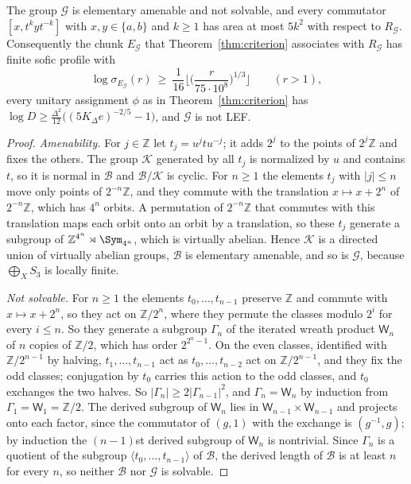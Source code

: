 \begin{theorem}\label{thm:dyadic}
The group $\mathcal G$ is elementary amenable and not solvable, and every commutator $[x,t^kyt^{-k}]$ with $x,y\in\{a,b\}$ and
$k\ge1$ has area at most $5k^2$ with respect to $R_{\mathcal G}$. Consequently the chunk $E_{\mathcal G}$ that Theorem~\ref{thm:criterion}
associates with $R_{\mathcal G}$ has finite sofic profile with
\[
\log\sigma_{E_{\mathcal G}}(r)\ \ge\ \frac1{16}\Big\lfloor\Big(\frac r{75\cdot10^8}\Big)^{1/3}\Big\rfloor\qquad(r>1),
\]
every unitary assignment $\phi$ as in Theorem~\ref{thm:criterion} has $\log D\ge\frac{\Delta^2}{12}\bigl((5K_\Delta e)^{-2/5}-1\bigr)$, and
$\mathcal G$ is not LEF.
\end{theorem}

\begin{proof}
\emph{Amenability.} For $j\in\mathbb Z$ let $t_j=u^jtu^{-j}$; it adds $2^j$ to the points of $2^j\mathbb Z$ and fixes the others. The group $\mathcal K$
generated by all $t_j$ is normalized by $u$ and contains $t$, so it is normal in $\mathcal B$ and $\mathcal B/\mathcal K$ is cyclic. For $n\ge1$ the elements $t_j$ with
$|j|\le n$ move only points of $2^{-n}\mathbb Z$, and they commute with the translation $x\mapsto x+2^n$ of $2^{-n}\mathbb Z$, which has $4^n$
orbits. A permutation of $2^{-n}\mathbb Z$ that commutes with this translation maps each orbit onto an orbit by a translation, so these $t_j$ generate a subgroup of
$\mathbb Z^{4^n}\rtimes\Sym_{4^n}$, which is virtually abelian. Hence $\mathcal K$ is a directed union of virtually abelian groups, $\mathcal B$ is elementary
amenable, and so is $\mathcal G$, because $\bigoplus_XS_3$ is locally finite.

\emph{Not solvable.} For $n\ge1$ the elements $t_0,\dots,t_{n-1}$ preserve $\mathbb Z$ and commute with $x\mapsto x+2^n$, so they act on
$\mathbb Z/2^n$, where they permute the classes modulo $2^i$ for every $i\le n$. So they generate a subgroup $\Gamma_n$ of the iterated wreath
product $\mathsf W_n$ of $n$ copies of $\mathbb Z/2$, which has order $2^{2^n-1}$. On the even classes, identified with $\mathbb Z/2^{n-1}$ by
halving, $t_1,\dots,t_{n-1}$ act as $t_0,\dots,t_{n-2}$ act on $\mathbb Z/2^{n-1}$, and they fix the odd classes; conjugation by $t_0$ carries
this action to the odd classes, and $t_0$ exchanges the two halves. So $|\Gamma_n|\ge2|\Gamma_{n-1}|^2$, and $\Gamma_n=\mathsf W_n$ by induction from $\Gamma_1=\mathsf W_1=\mathbb Z/2$. The derived
subgroup of $\mathsf W_n$ lies in $\mathsf W_{n-1}\times\mathsf W_{n-1}$ and projects onto each factor, since the commutator of $(g,1)$ with the
exchange is $(g^{-1},g)$; by induction the $(n-1)$st derived subgroup of $\mathsf W_n$ is nontrivial. Since $\Gamma_n$ is a quotient of the subgroup
$\langle t_0,\dots,t_{n-1}\rangle$ of $\mathcal B$, the derived length of $\mathcal B$ is at least $n$ for every $n$, so neither $\mathcal B$ nor
$\mathcal G$ is solvable.


\end{proof}
